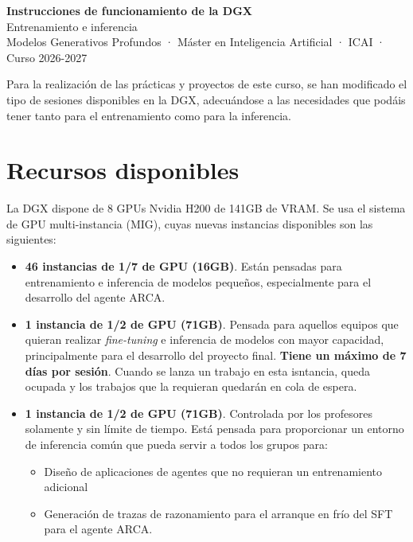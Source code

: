 \documentclass[11pt,a4paper]{article}
\begin{document}
\begin{center}
  {\Large\bfseries\color{arcablue} Instrucciones de funcionamiento de la DGX}\\[0.6ex]
  {\large Entrenamiento e inferencia}\\[1.2ex]
  {\small Modelos Generativos Profundos · Máster en Inteligencia Artificial · ICAI · Curso 2026-2027}\\[0.8ex]
\end{center}


Para la realización de las prácticas y proyectos de este curso, se han modificado el tipo 
de sesiones disponibles en la DGX, adecuándose a las necesidades que podáis tener tanto para el entrenamiento
como para la inferencia.

\section{Recursos disponibles}

La DGX dispone de 8 GPUs Nvidia H200 de 141GB de VRAM. Se usa el sistema de GPU multi-instancia (MIG),
cuyas nuevas instancias disponibles son las siguientes:

\begin{itemize}
  \item \textbf{46 instancias de 1/7 de GPU (16GB)}. Están pensadas para entrenamiento e inferencia
  de modelos pequeños, especialmente para el desarrollo del agente ARCA.
  \item \textbf{1 instancia de 1/2 de GPU (71GB)}. Pensada para aquellos equipos que quieran realizar 
  \textit{fine-tuning} e inferencia de modelos con mayor capacidad, principalmente para el desarrollo
  del proyecto final. \textbf{Tiene un máximo de 7 días por sesión}. Cuando se lanza un trabajo en esta isntancia,
  queda ocupada y los trabajos que la requieran quedarán en cola de espera.
  \item \textbf{1 instancia de 1/2 de GPU (71GB)}. Controlada por los profesores solamente y sin límite
  de tiempo. Está pensada para proporcionar un entorno de inferencia común que pueda servir a todos los grupos
  para:
  \begin{itemize}
    \item Diseño de aplicaciones de agentes que no requieran un entrenamiento adicional
    \item Generación de trazas de razonamiento para el arranque en frío del SFT para el agente ARCA.
  \end{itemize}
\end{itemize}
\end{document}
